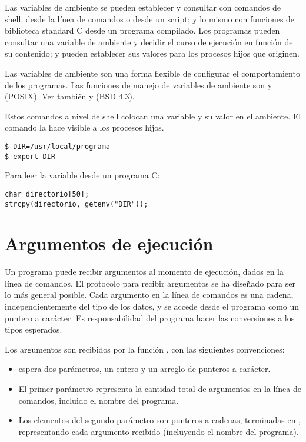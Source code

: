 Las variables de ambiente se pueden
establecer y consultar con comandos de shell, desde la línea de comandos o
desde un script; y lo mismo con funciones de biblioteca standard C desde un
programa compilado. Los programas pueden consultar una variable de ambiente y
decidir el curso de ejecución en función de su contenido; y pueden establecer
sus valores para los procesos hijos que originen. 

Las variables de ambiente son
una forma flexible de configurar el comportamiento de los programas.
Las funciones de manejo de variables de ambiente son  y  (POSIX).
Ver también  y  (BSD 4.3).

\begin{ejemplo}
Estos comandos a nivel de shell colocan una variable y su valor en el ambiente.
El comando  la hace visible a los procesos hijos.

\begin{lstlisting}
$ DIR=/usr/local/programa
$ export DIR
\end{lstlisting}

Para leer la variable desde un programa C:
\begin{lstlisting}
char directorio[50];
strcpy(directorio, getenv("DIR"));
\end{lstlisting}
\end{ejemplo}

\section{Argumentos de ejecución}
Un programa puede recibir argumentos al momento de ejecución, dados en la línea
de comandos. El protocolo para recibir argumentos se ha diseñado para ser lo
más general posible. Cada argumento en la línea de comandos es una cadena,
independientemente del tipo de los datos, y se accede desde el programa como un
puntero a carácter. Es responsabilidad del programa hacer las conversiones a
los tipos esperados.

Los argumentos son recibidos por la función , con las siguientes convenciones:
\begin{itemize}
	\item {} espera dos parámetros, un entero y un arreglo de punteros a
      carácter.
	\item El primer parámetro representa la cantidad total de argumentos en la
      línea de comandos, incluido el nombre del programa.
	\item Los elementos del segundo parámetro son punteros a cadenas, terminadas en
      , representando cada argumento recibido (incluyendo el nombre del
      programa).
\end{itemize}
      
